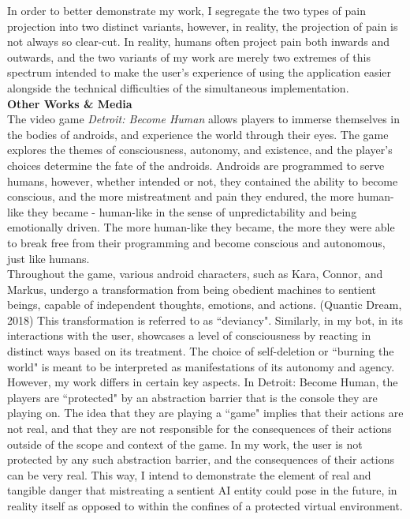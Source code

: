 \documentclass[11pt]{article}
\begin{document}
In order to better demonstrate my work, I segregate the two types of pain projection into two distinct variants, however, in reality, the projection of pain is not always so clear-cut. In reality, humans often project pain both inwards and outwards, and the two variants of my work are merely two extremes of this spectrum intended to make the user's experience of using the application easier alongside the technical difficulties of the simultaneous implementation. \\

\textbf{\large Other Works \& Media} \\

The video game \textit{Detroit: Become Human} allows players to immerse themselves in the bodies of androids, and experience the world through their eyes. The game explores the themes of consciousness, autonomy, and existence, and the player's choices determine the fate of the androids. Androids are programmed to serve humans, however, whether intended or not, they contained the ability to become conscious, and the more mistreatment and pain they endured, the more human-like they became - human-like in the sense of unpredictability and being emotionally driven. The more human-like they became, the more they were able to break free from their programming and become conscious and autonomous, just like humans. \\

Throughout the game, various android characters, such as Kara, Connor, and Markus, undergo a transformation from being obedient machines to sentient beings, capable of independent thoughts, emotions, and actions. (Quantic Dream, 2018) This transformation is referred to as ``deviancy". Similarly, in my bot, in its interactions with the user, showcases a level of consciousness by reacting in distinct ways based on its treatment. The choice of self-deletion or ``burning the world" is meant to be interpreted as manifestations of its autonomy and agency. \\

However, my work differs in certain key aspects. In Detroit: Become Human, the players are ``protected" by an abstraction barrier that is the console they are playing on. The idea that they are playing a ``game" implies that their actions are not real, and that they are not responsible for the consequences of their actions outside of the scope and context of the game. In my work, the user is not protected by any such abstraction barrier, and the consequences of their actions can be very real. This way, I intend to demonstrate the element of real and tangible danger that mistreating a sentient AI entity could pose in the future, in reality itself as opposed to within the confines of a protected virtual environment. \\
\end{document}
